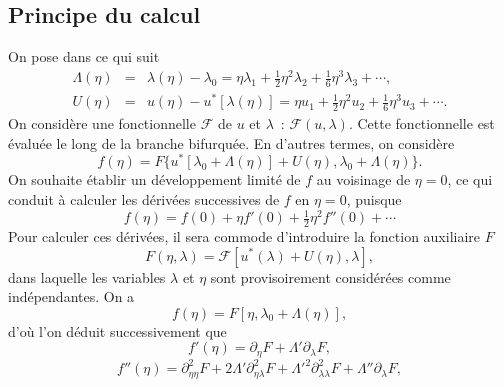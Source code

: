 \documentclass{article}
\begin{document}
\subsection{Principe du calcul}\label{sec20220107121442}

On pose dans ce qui suit
\begin{eqnarray}
  \Lambda (\eta) & = & \lambda (\eta) - \lambda_0 = \eta \lambda_1 +
  \tfrac{1}{2} \eta^2 \lambda_2 + \tfrac{1}{6} \eta^3 \lambda_3 + \cdots,
  \label{eq20211112155446}\\
  U (\eta) & = & u (\eta) - u^{\ast} [\lambda (\eta)] = \eta u_1 +
  \tfrac{1}{2} \eta^2 u_2 + \tfrac{1}{6} \eta^3 u_3 + \cdots .
  \label{eq20211112113028}
\end{eqnarray}
On considère une fonctionnelle $\mathcal{F}$ de $u$ et $\lambda$~:
$\mathcal{F} (u, \lambda)$. Cette fonctionnelle est évaluée le long de
la branche bifurquée. En d'autres termes, on considère
\begin{equation}
  f (\eta) = F \{ u^{\ast} [\lambda_0 + \Lambda (\eta)] + U (\eta), \lambda_0
  + \Lambda (\eta) \} .
\end{equation}
On souhaite établir un développement limité de $f$ au voisinage de
$\eta = 0$, ce qui conduit à calculer les dérivées successives de
$f$ en $\eta = 0$, puisque
\begin{equation}
  f (\eta) = f (0) + \eta f' (0) + \tfrac{1}{2} \eta^2 f'' (0) + \cdots
\end{equation}
Pour calculer ces dérivées, il sera commode d'introduire la fonction
auxiliaire $F$
\begin{equation}
  F (\eta, \lambda) =\mathcal{F} [u^{\ast} (\lambda) + U (\eta), \lambda],
\end{equation}
dans laquelle les variables $\lambda$ et $\eta$ sont provisoirement
considérées comme indépendantes. On a
\begin{equation}
  f (\eta) = F [\eta, \lambda_0 + \Lambda (\eta)],
\end{equation}
d'où l'on déduit successivement que
\begin{equation}
  \label{eq20211112162417} f' (\eta) = \partial_{\eta} F + \Lambda'
  \partial_{\lambda} F,
\end{equation}
\begin{equation}
  \label{eq20211112165810} f'' (\eta) = \partial_{\eta  \eta}^2 F + 2
  \Lambda' \partial_{\eta  \lambda}^2 {F + \Lambda'}^2
  \partial_{\lambda  \lambda}^2 F + \Lambda'' \partial_{\lambda} F,
\end{equation}
\end{document}
